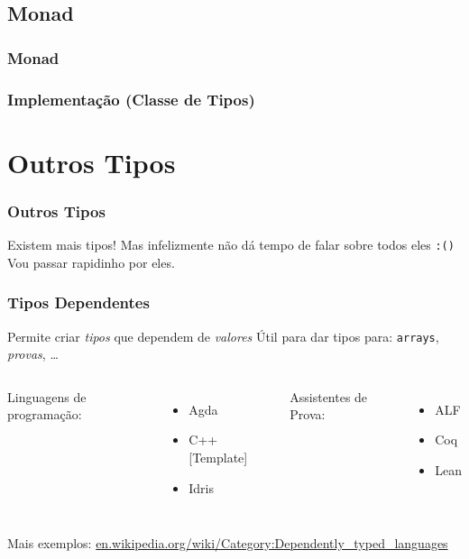 \documentclass{beamer}
\begin{document}
\subsection{Monad}
\begin{frame}
    \frametitle{Monad}
\end{frame}

\begin{frame}
    \frametitle{Implementação (Classe de Tipos)}
\end{frame}

\section{Outros Tipos}
\begin{frame}
    \frametitle{Outros Tipos}
    Existem mais tipos!
    \vfill
    Mas infelizmente não dá tempo de falar sobre todos eles
    \texttt{:(\phantom)}
    \vfill
    Vou passar rapidinho por eles.
\end{frame}

\begin{frame}
    \frametitle{Tipos Dependentes}
    Permite criar \emph{tipos} que dependem de \emph{valores}
    \vfill
    Útil para dar tipos para: \texttt{arrays}, \emph{provas}, \dots
    \vfill
    \begin{columns}
            Linguagens de programação:
            \begin{itemize}
                \item Agda
                \item C++ [Template]
                \item Idris
            \end{itemize}
            Assistentes de Prova:
            \begin{itemize}
                \item ALF
                \item Coq
                \item Lean
            \end{itemize}
    \end{columns}
    \vfill
    Mais exemplos:
    \url{en.wikipedia.org/wiki/Category:Dependently_typed_languages}
\end{frame}
\end{document}
